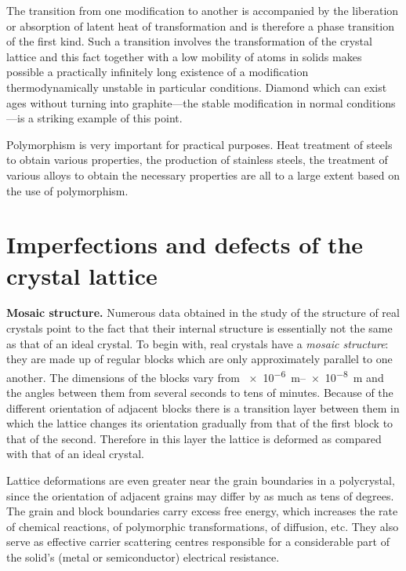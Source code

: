 The transition from one modification to another is accompanied by the liberation or absorption of latent heat of transformation and is therefore a phase transition of the first kind. Such a transition involves the transformation of the crystal lattice and this fact together with a low mobility of atoms in solids makes possible a practically infinitely long existence of a modification thermodynamically unstable in particular conditions. Diamond which can exist ages without turning into graphite---the stable modification in normal conditions---is a striking example of this point.

Polymorphism is very important for practical purposes. Heat treatment of steels to obtain various properties, the production of stainless steels, the treatment of various alloys to obtain the necessary properties are all to a large extent based on the use of polymorphism.

\section{Imperfections and defects of the crystal lattice}\label{sec:1_12}

\textbf{Mosaic structure.} Numerous data obtained in the study of the structure of real crystals point to the fact that their internal structure is essentially not the same as that of an ideal crystal. To begin with, real crystals have a \textit{mosaic structure}: they are made up of regular blocks which are only approximately parallel to one another. The dimensions of the blocks vary from \SIrange{e-6}{e-8}{\metre} and the angles between them from several seconds to tens of minutes. Because of the different orientation of adjacent blocks there is a transition layer between them in which the lattice changes its orientation gradually from that of the first block to that of the second. Therefore in this layer the lattice is deformed as compared with that of an ideal crystal.

Lattice deformations are even greater near the grain boundaries in a polycrystal, since the orientation of adjacent grains may differ by as much as tens of degrees. The grain and block boundaries carry excess free energy, which increases the rate of chemical reactions, of polymorphic transformations, of diffusion, etc. They also serve as effective carrier scattering centres responsible for a considerable part of the solid's (metal or semiconductor) electrical resistance.

